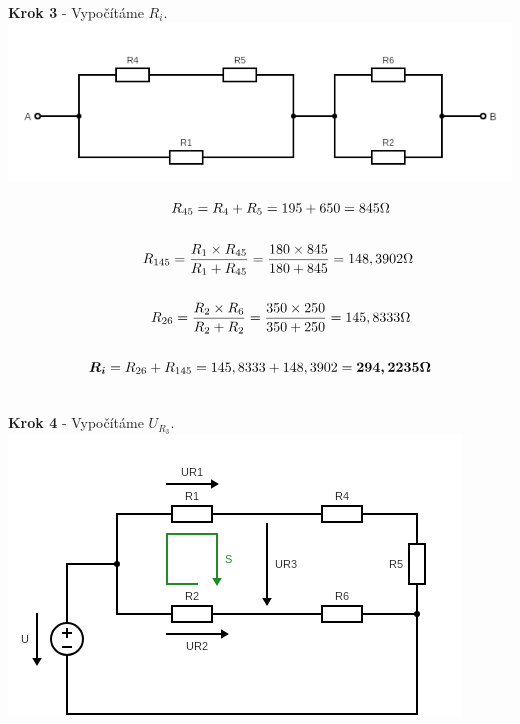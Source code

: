 \begin{center}
\textbf{Krok 3} - Vypočítáme  $R_i$. \\
\includegraphics[scale=0.8,keepaspectratio]{fig/Pr2_steps/Pr2_step03.png}
\end{center}
\vspace{-0.3cm}

\begin{gather*}
\newline
R_{45} = R_4 + R_5 = 195 + 650 = 845 \Omega \\\\
\newline
\newline
R_{145} = \frac{R_1 \times R_{45}}{R_1 + R_{45}} = \frac{180 \times 845}{180 + 845} = 148,3902 \Omega \\\\
\newline
\newline
R_{26} = \frac{R_2 \times R_6}{R_2 + R_2} = \frac{350 \times 250}{350 + 250} = 145,8333 \Omega \\\\
\newline
\newline
\boldsymbol{R_i} = R_{26} + R_{145} = 145,8333 + 148,3902 = \boldsymbol{294,2235 \Omega} \\\\
\end{gather*}

\newpage

\begin{center}
\textbf{Krok 4} - Vypočítáme  $U_{R_3}$. \\
\includegraphics[scale=0.8,keepaspectratio]{fig/Pr2_steps/Pr2_step04.png}
\end{center}
\vspace{-0.3cm}

